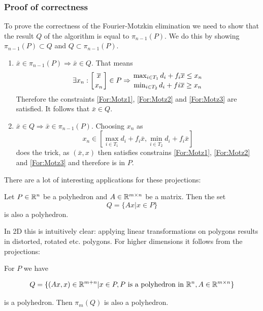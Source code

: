 \subsubsection*{Proof of correctness}
\begin{pr} To prove the correctness of the Fourier-Motzkin elimination we need to show that the result $Q$ of the algorithm is equal to $\pi_{n-1}(P)$. We do this by showing $\pi_{n-1}(P) \subset Q$ and $Q \subset \pi_{n-1}(P)$.
\begin{enumerate}

\item $\bar x \in \pi_{n-1}(P) \Rightarrow \bar x\in Q$. That means 
\[\exists x_n: \left[{\bar x}\atop{x_n}\right] \in P \Rightarrow {{\max_{i\in T_1} d_i +f_i \bar x \leq x_n} \atop {\min_{i\in T_2} d_i+fi\bar x \geq x_n}}\]
Therefore the constraints \ref{For:Motz1}, \ref{For:Motz2} and \ref{For:Motz3} are satisfied. It follows that $\bar x \in Q$. 

\item $\bar x \in Q \Rightarrow \bar x \in \pi_{n-1}(P)$. Choosing $x_n$ as 
\[x_n \in [\max_{i\in T_1} d_i+f_i \bar x, \min_{i\in T_2} d_i+f_i \bar x]\]
does the trick, as $(\bar x, x)$ then satisfies constrains \ref{For:Motz1}, \ref{For:Motz2} and \ref{For:Motz3} and therefore is in $P$.

\end{enumerate}
\end{pr}

There are a lot of interesting applications for these projections:

\begin{thm}\label{Thm:linTransPoly} Let $P\in \R^n$ be a polyhedron and $A\in \R^{m\times n}$ be a matrix. Then the set
\[Q=\{Ax|x\in P\}\]
is also a polyhedron.
\end{thm}

In 2D this is intuitively clear: applying linear transformations on polygons results in distorted, rotated etc. polygons. For higher dimensions it follows from the projections:

\begin{pr} For $P$ we have

\[Q=\{(Ax,x)\in \R^{m+n}| x\in P, P\text{ is a polyhedron in } \R^{n}, A \in \R^{m \times n}\}\]  %

is a polyhedron. Then $\pi_m(Q)$ is also a polyhedron.
\end{pr}

